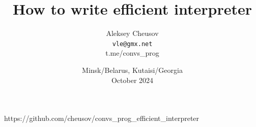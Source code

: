 \documentclass[hyperref={colorlinks=true},xcolor=table]{beamer}
\title{How to write efficient interpreter}
\author{Aleksey Cheusov 
  \\  \texttt{vle@gmx.net}\\
  t.me/convs\_prog\\
}
\date{Minsk/Belarus, Kutaisi/Georgia\\
  October 2024\\
}
\begin{document}

\newenvironment{Code}[1]%
              {\Verbatim[label=\bf{#1},frame=single,%
                  fontsize=\small,%
                  commandchars=\\\{\}]}%
              {\endVerbatim}


\newenvironment{CodeNoLabel}%
               {\Verbatim[frame=single,%
                   fontsize=\small,%
                   commandchars=\\\{\}]}%
               {\endVerbatim}
\newenvironment{CodeNoLabelTiny}%
               {\Verbatim[frame=single,%
                   fontsize=\tiny,%
                   commandchars=\\\{\}]}%
               {\endVerbatim}
\newenvironment{CodeNoLabelSmallest}%
               {\Verbatim[frame=single,%
                   fontsize=\footnotesize,%
                   commandchars=\\\{\}]}%
               {\endVerbatim}
\newenvironment{CodeLarge}%
               {\Verbatim[frame=single,%
                   fontsize=\large,%
                   commandchars=\\\{\}]}%
               {\endVerbatim}

\newcommand{\prompt}[1]{{\bf{#1}}}
\newcommand{\h}[1]{{\bf{#1}}}
\newcommand{\URL}[1]{\textbf{#1}}
\newcommand{\AutohellFile}[1]{\textcolor{red}{#1}}
\newcommand{\MKCfile}[1]{\textcolor{green}{#1}}
\newcommand{\ModuleName}[1]{\textbf{#1}\textnormal{}}
\newcommand{\ProgName}[1]{\textbf{#1}\textnormal{}}
\newcommand{\ProjectName}[1]{\textbf{#1}\textnormal{}}
\newcommand{\PackageName}[1]{\textbf{#1}\textnormal{}}
\newcommand{\MKC}[1]{\large\textsf{#1}\textnormal{}\normalsize}

\begin{frame}
  \titlepage
  https://github.com/cheusov/convs\_prog\_efficient\_interpreter
\end{frame}
\end{document}
